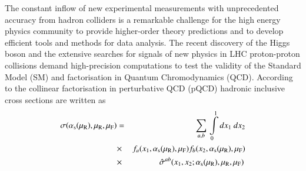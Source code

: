 The constant inflow of new experimental measurements 
with unprecedented accuracy from hadron colliders is a remarkable challenge 
for the high energy physics community to provide higher-order theory 
predictions and to develop efficient tools and methods for data analysis.
The recent discovery of the Higgs boson \cite{Aad:2012tfa,Chatrchyan:2012ufa} 
and the extensive searches
for signals of new physics in LHC proton-proton collisions
demand high-precision computations to test the validity of the Standard Model (SM)
and factorisation in Quantum Chromodynamics (QCD).
According to the collinear factorisation in perturbative QCD (pQCD)
hadronic inclusive cross sections are written as
%
\begin{eqnarray}
\small
%
\sigma(\as(\mur),\mur,\muf)&=& \sum\limits_{a,b}\,  \int\limits_{0}\limits^{1} dx_1\ dx_2 \nonumber \\
&\times& f_a(x_1,\as(\mur),\muf) 
 f_b(x_2,\as(\mur),\muf) \nonumber \\ 
&\times&  \, \hat{\sigma}^{ab}(x_1,x_2;\as(\mur),\mur,\muf)\,
\label{eq:fact}
\end{eqnarray}
